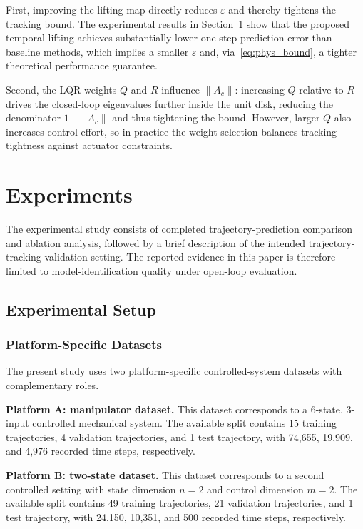 \documentclass[journal]{IEEEtran}
\begin{document}
First, improving the lifting map directly reduces $\varepsilon$ and thereby tightens the tracking bound. The experimental results in Section~\ref{sec:experiments} show that the proposed temporal lifting achieves substantially lower one-step prediction error than baseline methods, which implies a smaller $\varepsilon$ and, via~\eqref{eq:phys_bound}, a tighter theoretical performance guarantee.

Second, the LQR weights $Q$ and $R$ influence $\|A_c\|$: increasing $Q$ relative to $R$ drives the closed-loop eigenvalues further inside the unit disk, reducing the denominator $1 - \|A_c\|$ and thus tightening the bound. However, larger $Q$ also increases control effort, so in practice the weight selection balances tracking tightness against actuator constraints.

\section{Experiments}
\label{sec:experiments}

The experimental study consists of completed trajectory-prediction comparison and ablation analysis, followed by a brief description of the intended trajectory-tracking validation setting. The reported evidence in this paper is therefore limited to model-identification quality under open-loop evaluation.

\subsection{Experimental Setup}

\subsubsection{Platform-Specific Datasets}

The present study uses two platform-specific controlled-system datasets with complementary roles.

\textbf{Platform A: manipulator dataset.} This dataset corresponds to a 6-state, 3-input controlled mechanical system. The available split contains 15 training trajectories, 4 validation trajectories, and 1 test trajectory, with 74,655, 19,909, and 4,976 recorded time steps, respectively.

\textbf{Platform B: two-state dataset.} This dataset corresponds to a second controlled setting with state dimension $n=2$ and control dimension $m=2$. The available split contains 49 training trajectories, 21 validation trajectories, and 1 test trajectory, with 24,150, 10,351, and 500 recorded time steps, respectively.
\end{document}

